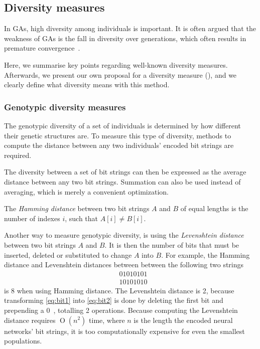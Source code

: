 \subsection{Diversity measures}
In GAs, high diversity among individuals is important. It is often argued that the weakness of GAs is the fall in diversity over generations, which often results in premature convergence~\cite{diaz2007empirical, 1266373,Zitzler00comparisonof}.

Here, we summarise key points regarding well-known diversity measures. Afterwards, we present our own proposal for a diversity measure (\dia), and we clearly define what diversity means with this method.

\subsubsection{Genotypic diversity measures}
The genotypic diversity of a set of individuals is determined by how different their genetic structures are. To measure this type of diversity, methods to compute the distance between any two individuals' encoded bit strings are required.

The diversity between a set of bit strings can then be expressed as the average distance between any two bit strings. Summation can also be used instead of averaging, which is merely a convenient optimization.

The \emph{Hamming distance} between two bit strings $A$ and $B$ of equal lengths is the number of indexes $i$, such that $A[i] \neq B[i]$.

Another way to measure genotypic diversity, is using the \emph{Levenshtein distance} between two bit strings $A$ and $B$. It is then the number of bits that must be inserted, deleted or substituted to change $A$ into $B$. For example, the Hamming distance and Levenshtein distances between between the following two strings
%
\begin{align}
&01010101\label{eq:bit1} \\
&10101010\label{eq:bit2}
\end{align}
%
is 8 when using Hamming distance. The Levenshtein distance is 2, because transforming \cref{eq:bit1} into \cref{eq:bit2} is done by deleting the first bit and prepending a $0$~\cite{1250187}, totalling 2 operations. Because computing the Levenshtein distance requires $\operatorname{O}\left(n^2\right)$ time, where $n$ is the length the encoded neural networks' bit strings, it is too computationally expensive for even the smallest populations.

